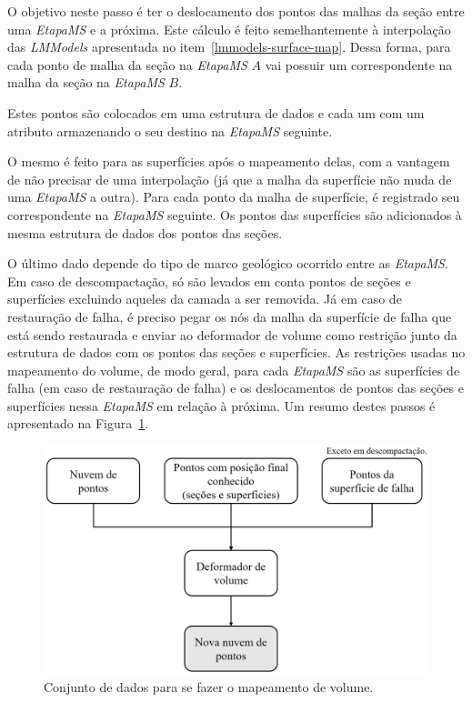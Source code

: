 O objetivo neste passo é ter o deslocamento dos pontos das malhas da seção entre uma \emph{EtapaMS} e a próxima. Este cálculo é feito semelhantemente à interpolação das \emph{LMModels} apresentada no item~\ref{lmmodels-surface-map}. Dessa forma, para cada ponto de malha da seção na \emph{EtapaMS} $A$ vai possuir um correspondente na malha da seção na \emph{EtapaMS} $B$.

Estes pontos são colocados em uma estrutura de dados e cada um com um atributo armazenando o seu destino na \emph{EtapaMS} seguinte.

O mesmo é feito para as superfícies após o mapeamento delas, com a vantagem de não precisar de uma interpolação (já que a malha da superfície não muda de uma \emph{EtapaMS} a outra). Para cada ponto da malha de superfície, é registrado seu correspondente na \emph{EtapaMS} seguinte. Os pontos das superfícies são adicionados à mesma estrutura de dados dos pontos das seções.

O último dado depende do tipo de marco geológico ocorrido entre as \emph{EtapaMS}. Em caso de descompactação, só são levados em conta pontos de seções e superfícies excluindo aqueles da camada a ser removida. Já em caso de restauração de falha, é preciso pegar os nós da malha da superfície de falha que está sendo restaurada e enviar ao deformador de volume como restrição junto da estrutura de dados com os pontos das seções e superfícies. As restrições usadas no mapeamento do volume, de modo geral, para cada \emph{EtapaMS} são as superfícies de falha (em caso de restauração de falha) e os deslocamentos de pontos das seções e superfícies nessa \emph{EtapaMS} em relação à próxima.  Um resumo destes passos é apresentado na Figura~\ref{fig-vol-algorithm}.

\begin{figure} [H]
  \begin{center}
    \includegraphics[width=350pt]{images/fig-vol-algorithm}
    \caption{Conjunto de dados para se fazer o mapeamento de volume.}\label{fig-vol-algorithm}
  \end{center}
\end{figure}


